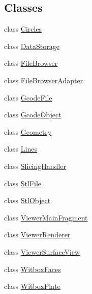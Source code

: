 \subsection*{Classes}
\begin{DoxyCompactItemize}
\item 
class \hyperlink{classandroid_1_1app_1_1printerapp_1_1viewer_1_1_circles}{Circles}
\item 
class \hyperlink{classandroid_1_1app_1_1printerapp_1_1viewer_1_1_data_storage}{Data\+Storage}
\item 
class \hyperlink{classandroid_1_1app_1_1printerapp_1_1viewer_1_1_file_browser}{File\+Browser}
\item 
class \hyperlink{classandroid_1_1app_1_1printerapp_1_1viewer_1_1_file_browser_adapter}{File\+Browser\+Adapter}
\item 
class \hyperlink{classandroid_1_1app_1_1printerapp_1_1viewer_1_1_gcode_file}{Gcode\+File}
\item 
class \hyperlink{classandroid_1_1app_1_1printerapp_1_1viewer_1_1_gcode_object}{Gcode\+Object}
\item 
class \hyperlink{classandroid_1_1app_1_1printerapp_1_1viewer_1_1_geometry}{Geometry}
\item 
class \hyperlink{classandroid_1_1app_1_1printerapp_1_1viewer_1_1_lines}{Lines}
\item 
class \hyperlink{classandroid_1_1app_1_1printerapp_1_1viewer_1_1_slicing_handler}{Slicing\+Handler}
\item 
class \hyperlink{classandroid_1_1app_1_1printerapp_1_1viewer_1_1_stl_file}{Stl\+File}
\item 
class \hyperlink{classandroid_1_1app_1_1printerapp_1_1viewer_1_1_stl_object}{Stl\+Object}
\item 
class \hyperlink{classandroid_1_1app_1_1printerapp_1_1viewer_1_1_viewer_main_fragment}{Viewer\+Main\+Fragment}
\item 
class \hyperlink{classandroid_1_1app_1_1printerapp_1_1viewer_1_1_viewer_renderer}{Viewer\+Renderer}
\item 
class \hyperlink{classandroid_1_1app_1_1printerapp_1_1viewer_1_1_viewer_surface_view}{Viewer\+Surface\+View}
\item 
class \hyperlink{classandroid_1_1app_1_1printerapp_1_1viewer_1_1_witbox_faces}{Witbox\+Faces}
\item 
class \hyperlink{classandroid_1_1app_1_1printerapp_1_1viewer_1_1_witbox_plate}{Witbox\+Plate}
\end{DoxyCompactItemize}
